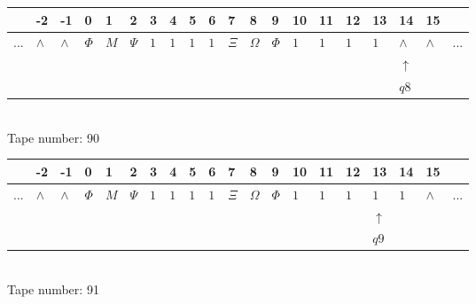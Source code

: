 \documentclass[11pt]{article}
\begin{document}
\begin{table}[H]
\centering
\begin{tabular}{llllllllllllllllllll}
 & -2 & -1 & 0 & 1 & 2 & 3 & 4 & 5 & 6 & 7 & 8 & 9 & 10 & 11 & 12 & 13 & 14 & 15 & \\
\hline
$...$ & \multicolumn{1}{|l|}{$\wedge$} & \multicolumn{1}{|l|}{$\wedge$} & \multicolumn{1}{|l|}{$\Phi$} & \multicolumn{1}{|l|}{$M$} & \multicolumn{1}{|l|}{$\Psi$} & \multicolumn{1}{|l|}{$1$} & \multicolumn{1}{|l|}{$1$} & \multicolumn{1}{|l|}{$1$} & \multicolumn{1}{|l|}{$1$} & \multicolumn{1}{|l|}{$\Xi$} & \multicolumn{1}{|l|}{$\Omega$} & \multicolumn{1}{|l|}{$\Phi$} & \multicolumn{1}{|l|}{$1$} & \multicolumn{1}{|l|}{$1$} & \multicolumn{1}{|l|}{$1$} & \multicolumn{1}{|l|}{$1$} & \multicolumn{1}{|l|}{$\wedge$} & \multicolumn{1}{|l|}{$\wedge$} & $...$\\
\hline
&  &  &  &  &  &  &  &  &  &  &  &  &  &  &  &  & $\uparrow$ &  &  \\
&  &  &  &  &  &  &  &  &  &  &  &  &  &  &  &  & $ q8 $ &  &  \\
\end{tabular}
\\
Tape number: 90
\noindent\makebox[\linewidth]{\hdashrule{\textwidth}{1pt}{1pt}}\end{table}

\begin{table}[H]
\centering
\begin{tabular}{llllllllllllllllllll}
 & -2 & -1 & 0 & 1 & 2 & 3 & 4 & 5 & 6 & 7 & 8 & 9 & 10 & 11 & 12 & 13 & 14 & 15 & \\
\hline
$...$ & \multicolumn{1}{|l|}{$\wedge$} & \multicolumn{1}{|l|}{$\wedge$} & \multicolumn{1}{|l|}{$\Phi$} & \multicolumn{1}{|l|}{$M$} & \multicolumn{1}{|l|}{$\Psi$} & \multicolumn{1}{|l|}{$1$} & \multicolumn{1}{|l|}{$1$} & \multicolumn{1}{|l|}{$1$} & \multicolumn{1}{|l|}{$1$} & \multicolumn{1}{|l|}{$\Xi$} & \multicolumn{1}{|l|}{$\Omega$} & \multicolumn{1}{|l|}{$\Phi$} & \multicolumn{1}{|l|}{$1$} & \multicolumn{1}{|l|}{$1$} & \multicolumn{1}{|l|}{$1$} & \multicolumn{1}{|l|}{$1$} & \multicolumn{1}{|l|}{$1$} & \multicolumn{1}{|l|}{$\wedge$} & $...$\\
\hline
&  &  &  &  &  &  &  &  &  &  &  &  &  &  &  & $\uparrow$ &  &  &  \\
&  &  &  &  &  &  &  &  &  &  &  &  &  &  &  & $ q9 $ &  &  &  \\
\end{tabular}
\\
Tape number: 91
\noindent\makebox[\linewidth]{\hdashrule{\textwidth}{1pt}{1pt}}\end{table}
\end{document}
